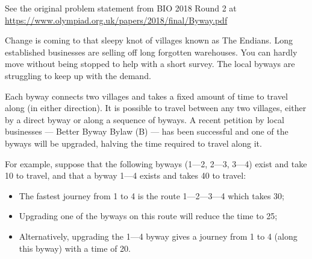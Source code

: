 \begin{center}\small{
  See the original problem statement from BIO 2018 Round 2 at
  \url{https://www.olympiad.org.uk/papers/2018/final/Byway.pdf}
}\end{center}

Change is coming to that sleepy knot of villages known as The Endians. Long
established businesses are selling off long forgotten warehouses. You can hardly
move without being stopped to help with a short survey. The local byways are
struggling to keep up with the demand.

Each byway connects two villages and takes a fixed amount of time to travel
along (in either direction). It is possible to travel between any two villages, either
by a direct byway or along a sequence of byways. A recent petition by local
businesses --- Better Byway Bylaw (B) --- has been successful and one of the
byways will be upgraded, halving the time required to travel along it.

For example, suppose that the following byways (1---2, 2---3, 3---4) exist and take
10 to travel, and that a byway 1---4 exists and takes 40 to travel:

\begin{itemize}
  \item The fastest journey from 1 to 4 is the route 1---2---3---4 which takes 30;
  \item Upgrading one of the byways on this route will reduce the time to 25;
  \item Alternatively, upgrading the 1---4 byway gives a journey from 1 to 4 (along this byway) with a time of 20.
\end{itemize}
